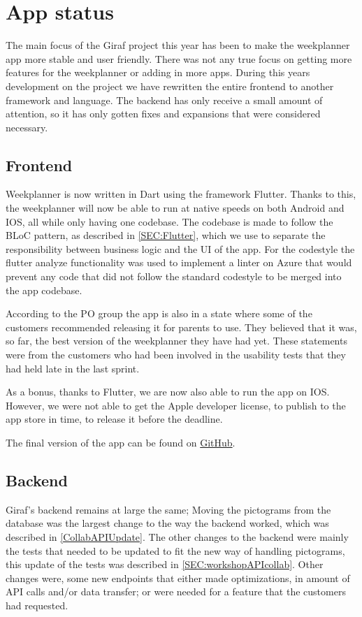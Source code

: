 \section{App status}
The main focus of the Giraf project this year has been to make the weekplanner app more stable and user friendly.
There was not any true focus on getting more features for the weekplanner or adding in more apps.
During this years development on the project we have rewritten the entire frontend to another framework and language.
The backend has only receive a small amount of attention, so it has only gotten fixes and expansions that were considered necessary.

\subsection{Frontend}
Weekplanner is now written in Dart using the framework Flutter.
Thanks to this, the weekplanner will now be able to run at native speeds on both Android and IOS, all while only having one codebase.
The codebase is made to follow the BLoC pattern, as described in \autoref{SEC:Flutter}, which we use to separate the responsibility between business logic and the UI of the app. 
For the codestyle the flutter analyze functionality was used to implement a linter on Azure that would prevent any code that did not follow the standard codestyle to be merged into the app codebase.

According to the PO group the app is also in a state where some of the customers recommended releasing it for parents to use.
They believed that it was, so far, the best version of the weekplanner they have had yet.
These statements were from the customers who had been involved in the usability tests that they had held late in the last sprint.

As a bonus, thanks to Flutter, we are now also able to run the app on IOS.
However, we were not able to get the Apple developer license, to publish to the app store in time, to release it before the deadline.

The final version of the app can be found on \href{https://github.com/aau-giraf/weekplanner/tree/2019-Final}{GitHub}.


\subsection{Backend}
Giraf's backend remains at large the same; Moving the pictograms from the database was the largest change to the way the backend worked, which was described in \autoref{CollabAPIUpdate}.
The other changes to the backend were mainly the tests that needed to be updated to fit the new way of handling pictograms, this update of the tests was described in \autoref{SEC:workshopAPIcollab}.
Other changes were, some new endpoints that either made optimizations, in amount of API calls and/or data transfer; or were needed for a feature that the customers had requested.

